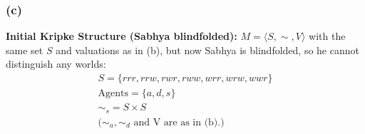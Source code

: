 \subsubsection*{(c)}

\textbf{Initial Kripke Structure (Sabhya blindfolded):} 
\( M = \langle S,\sim,V \rangle\) with the same set \(S\) and 
valuations as in (b), but now Sabhya is blindfolded, 
so he cannot distinguish any worlds:
\begin{gather*}
    S = \{ rrr, rrw, rwr, rww, wrr, wrw, wwr \} \\
    \text{Agents} = \{a,d,s\} \\
    \sim_{s} = S \times S \\
    \text{(\(\sim_{a},\sim_{d}\) and V are as in (b).)}
\end{gather*}